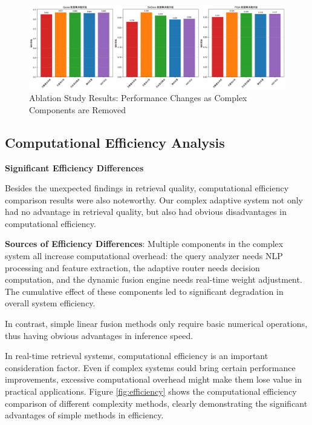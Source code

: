 \documentclass[letterpaper]{article} %
\begin{document}
\begin{figure}[t]
\centering
\includegraphics[width=0.8\columnwidth]{charts/ablation_study.png}
\caption{Ablation Study Results: Performance Changes as Complex Components are Removed}
\label{fig:ablation}
\end{figure}

\subsection{Computational Efficiency Analysis}

\textbf{Significant Efficiency Differences}

Besides the unexpected findings in retrieval quality, computational efficiency comparison results were also noteworthy. Our complex adaptive system not only had no advantage in retrieval quality, but also had obvious disadvantages in computational efficiency.

\textbf{Sources of Efficiency Differences}:
Multiple components in the complex system all increase computational overhead: the query analyzer needs NLP processing and feature extraction, the adaptive router needs decision computation, and the dynamic fusion engine needs real-time weight adjustment. The cumulative effect of these components led to significant degradation in overall system efficiency.

In contrast, simple linear fusion methods only require basic numerical operations, thus having obvious advantages in inference speed.

In real-time retrieval systems, computational efficiency is an important consideration factor. Even if complex systems could bring certain performance improvements, excessive computational overhead might make them lose value in practical applications. Figure \ref{fig:efficiency} shows the computational efficiency comparison of different complexity methods, clearly demonstrating the significant advantages of simple methods in efficiency.
\end{document}
